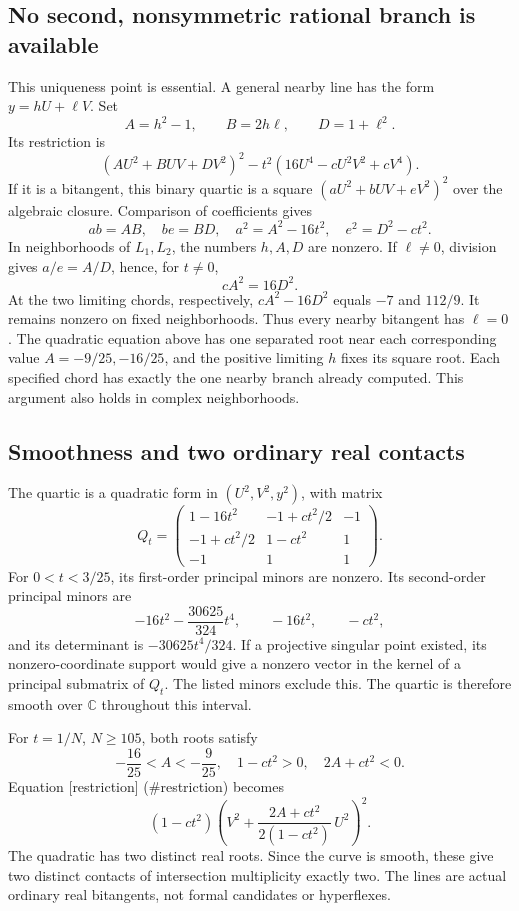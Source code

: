 \documentclass[10pt]{article}
\begin{document}
\subsection*{No second, nonsymmetric rational branch is available}
This uniqueness point is essential. A general nearby line has the form \(y=hU+\ell V\). Set \[A=h^2-1,\qquad B=2h\ell,\qquad D=1+\ell^2.\] Its restriction is \[(AU^2+BUV+DV^2)^2-t^2(16U^4-cU^2V^2+cV^4).\] If it is a bitangent, this binary quartic is a square \((aU^2+bUV+eV^2)^2\) over the algebraic closure. Comparison of coefficients gives \[ab=AB,\quad be=BD,\quad
 a^2=A^2-16t^2,\quad e^2=D^2-ct^2.\] In neighborhoods of \(L_1,L_2\), the numbers \(h,A,D\) are nonzero. If \(\ell\ne0\), division gives \(a/e=A/D\), hence, for \(t\ne0\), \[cA^2=16D^2.\] At the two limiting chords, respectively, \(cA^2-16D^2\) equals \(-7\) and \(112/9\). It remains nonzero on fixed neighborhoods. Thus every nearby bitangent has \(\ell=0\). The quadratic equation above has one separated root near each corresponding value \(A=-9/25,-16/25\), and the positive limiting \(h\) fixes its square root. Each specified chord has exactly the one nearby branch already computed. This argument also holds in complex neighborhoods.\par
\subsection*{Smoothness and two ordinary real contacts}
The quartic is a quadratic form in \((U^2,V^2,y^2)\), with matrix \[Q_t=\begin{pmatrix}
 1-16t^2&-1+ct^2/2&-1\\
 -1+ct^2/2&1-ct^2&1\\
 -1&1&1
 \end{pmatrix}.\] For \(0<t<3/25\), its first-order principal minors are nonzero. Its second-order principal minors are \[-16t^2-\frac{30625}{324}t^4,\qquad -16t^2,\qquad -ct^2,\] and its determinant is \(-30625t^4/324\). If a projective singular point existed, its nonzero-coordinate support would give a nonzero vector in the kernel of a principal submatrix of \(Q_t\). The listed minors exclude this. The quartic is therefore smooth over \(\mathbb C\) throughout this interval.\par
For \(t=1/N\), \(N\ge105\), both roots satisfy \[-\frac{16}{25}<A<-\frac9{25},\quad
 1-ct^2>0,\quad 2A+ct^2<0.\] Equation [restriction] (\#restriction) becomes \[(1-ct^2)\left(V^2+
       \frac{2A+ct^2}{2(1-ct^2)}\,U^2\right)^2.\] The quadratic has two distinct real roots. Since the curve is smooth, these give two distinct contacts of intersection multiplicity exactly two. The lines are actual ordinary real bitangents, not formal candidates or hyperflexes.\par
\end{document}
